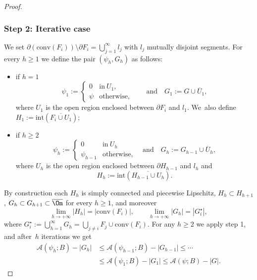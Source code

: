 \begin{proof}
\subsubsection*{Step 2: Iterative case}
We set $\partial(\mathrm{conv}(F_i))
\setminus\partial F_i=\bigcup_{j=1}^\infty l_j$ with $l_j$ mutually disjoint segments.
For every $h\ge1$ we define the pair $(\psi_{h},G_{h})$ as follows:
\begin{itemize}
\item if $h=1$
\begin{equation*}
\psi_{1}:=\begin{cases}
0&\text{in}\ U_1,\\
\psi&\text{otherwise,}
\end{cases}\qquad \text{and}\quad
G_{1}:=G\cup \overline U_1,
\end{equation*}
where $U_1$ is the open region enclosed between $\partial F_i$ and $l_1$. We~also define $H_1:=\mathrm{int}(\overline{F_i\cup U_1})$;
\item if $h\ge2$
\begin{equation*}
\psi_{h}:=\begin{cases}
0&\text{in}\ U_h\\
\psi_{h-1}&\text{otherwise,}
\end{cases}\quad\text{and}\quad
G_{h}:=G_{h-1}\cup\overline U_h ,
\end{equation*}
where $U_h$ is the open region enclosed between $\partial H_{h-1}$ and $l_h$ and
\[
H_h:=\mathrm{int}(\overline{H_{h-1}\cup U_h}).
\]
\end{itemize}
By construction each $H_{h}$ is
simply connected and piecewise Lipschitz, $H_{h}\subset H_{h+1}$, $G_{h}\subset G_{h+1}\subset\overline\Om$ for every $h\ge1$, and moreover
\begin{equation}\label{limit_E*}
\lim_{h\to+\infty} |H_{h}|=|\mathrm{conv}(F_i)|,\qquad
\lim_{h\to+\infty} |G_{h}|=|G^\star_i|,
\end{equation}
where $G^\star_i:=\bigcup_{h=1}^\infty G_h=\bigcup_{j\neq i}F_j\cup \mathrm{conv}(F_i) $. For any $h\geq2$ we apply step 1,
and after~$h$ iterations we get
\begin{equation}\label{iterative_proc*}
\begin{aligned}
\mathcal{A}(\psi_{h};B)-|G_{h}|&\le \mathcal{A}(\psi_{h-1};B)-|G_{h-1}|\le\cdots\\
&\le \mathcal{A}(\psi_{1};B)-|G_{1}|\le \mathcal{A}(\psi;B)-|G|.
\end{aligned}
\end{equation}

\end{proof}
